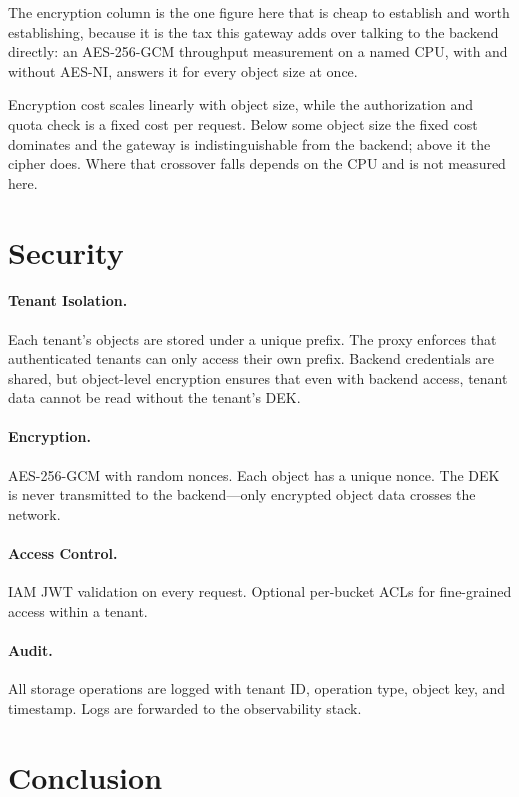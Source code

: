 \documentclass[11pt,twocolumn]{article}
\begin{document}
The encryption column is the one figure here that is cheap to establish and
worth establishing, because it is the tax this gateway adds over talking to the
backend directly: an AES-256-GCM throughput measurement on a named CPU, with and
without AES-NI, answers it for every object size at once.

Encryption cost scales linearly with object size, while the authorization and quota check is a fixed cost per request. Below some object size the fixed cost dominates and the gateway is indistinguishable from the backend; above it the cipher does. Where that crossover falls depends on the CPU and is not measured here.

\section{Security}

\paragraph{Tenant Isolation.} Each tenant's objects are stored under a unique prefix. The proxy enforces that authenticated tenants can only access their own prefix. Backend credentials are shared, but object-level encryption ensures that even with backend access, tenant data cannot be read without the tenant's DEK.

\paragraph{Encryption.} AES-256-GCM with random nonces. Each object has a unique nonce. The DEK is never transmitted to the backend---only encrypted object data crosses the network.

\paragraph{Access Control.} IAM JWT validation on every request. Optional per-bucket ACLs for fine-grained access within a tenant.

\paragraph{Audit.} All storage operations are logged with tenant ID, operation type, object key, and timestamp. Logs are forwarded to the observability stack.

\section{Conclusion}
\end{document}
